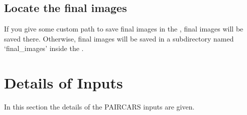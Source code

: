 \documentclass[letterpaper,10pt,english]{sphinxmanual}
\begin{document}
\section{Locate the final images}
\label{\detokenize{tut:locate-the-final-images}}
\sphinxAtStartPar
If you give some custom path to save final images in the , final images will be saved there. Otherwise, final images will be saved in a sub\sphinxhyphen{}directory named ‘final\_images’ inside the .


\chapter{Details of Inputs}
\label{\detokenize{inputs:details-of-inputs}}\label{\detokenize{inputs::doc}}
\sphinxAtStartPar
In this section the details of the P\sphinxhyphen{}AIRCARS inputs are given.
\end{document}

